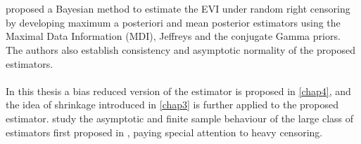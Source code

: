 \\\\
\cite{ameraoui2016bayesian} proposed a Bayesian method to estimate the EVI under random right censoring by developing maximum a posteriori and mean posterior estimators using the Maximal Data Information (MDI), Jeffreys and the conjugate Gamma priors. The authors also establish consistency and asymptotic normality of the proposed estimators.
\\\\
In this thesis a bias reduced version of the \cite{worms2014new} estimator is proposed in \autoref{chap4}, and the idea of shrinkage introduced in \autoref{chap3} is further applied to the proposed estimator. \cite{beirlant2018estimation} study the asymptotic and finite sample behaviour of the large class of estimators first proposed in \cite{worms2014new}, paying special attention to heavy censoring.
\\\\

